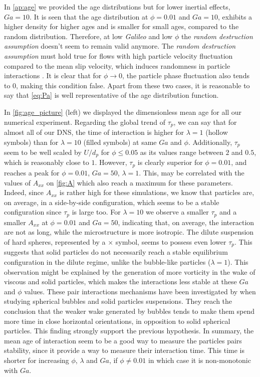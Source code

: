 In \ref{ap:age}  we provided the age distributions but for lower inertial effects, $Ga = 10$. 
It is seen that the age distribution at $\phi = 0.01$ and $Ga = 10$, exhibits a higher density for higher ages and is smaller for small ages, compared to the random distribution.
Therefore, at low \textit{Galileo} and low $\phi$ the \textit{random destruction assumption} doesn't seem to remain valid anymore. 
The \textit{random destruction assumption} must hold true for flows with high particle velocity fluctuation compared to the mean slip velocity, which induces randomness in particle interactions \citep{zhang2023evolution}. 
It is clear that for $\phi \rightarrow 0$, the particle phase fluctuation also tends to $0$, making this condition false. 
Apart from these two cases, it is reasonable to say that \ref{eq:Pa} is well representative of the age distribution function.

In \ref{fig:age_picture} (left) we displayed the dimensionless mean age for all our numerical experiment. 
Regarding the global trend of $\tau_p$, we can say that for almost all of our DNS, the time of interaction is higher for $\lambda = 1$ (hollow symbols) than for $\lambda = 10$ (filled symbols) at same $Ga$ and $\phi$.
Additionally,  $\tau_p$ seem to be well scaled by $U/d_p$ for $\phi  \leq 0.05$ as its values range between $2$ and $0.5$, which is reasonably close to $1$. 
However, $\tau_p$ is clearly superior for $\phi = 0.01$, and reaches a peak for $\phi=0.01$, $Ga=50$, $\lambda=1$.
This, may be correlated with the values of $A_{xx}$ on \ref{fig:A} which also reach a maximum for these parameters. 
Indeed, since $A_{xx}$ is rather high for these simulations, we know that particles are, on average, in a side-by-side configuration, which seems to be a stable configuration since $\tau_p$ is large too.
For $\lambda = 10$ we observe a smaller $\tau_p$ and a smaller $A_{xx}$ at $\phi = 0.01$ and $Ga = 50$, indicating that, on average, the interaction are not as long, while the microstructure is more isotropic. 
The dilute suspension of hard spheres, represented by a $\pmb\times$ symbol, seems to possess even lower $\tau_p$. 
This suggests that solid particles do not necessarily reach a stable equilibrium configuration in the dilute regime, unlike the bubble-like particles ($\lambda = 1$). 
This observation might be explained by the generation of more vorticity in the wake of viscous and solid particles, which makes the interactions less stable at these $Ga$ and $\phi$ values.
These pair interactions mechanisms have been investigated by \citet{yin2008lattice} when studying spherical bubbles and solid particles suspensions.
They reach the conclusion that the weaker wake generated by bubbles tends to make them spend more time in close horizontal orientations, in opposition to solid spherical particles. 
This finding strongly support the previous hypothesis. 
In summary, the mean age of interaction seem to be a good way to measure the particles pairs stability, since it provide a way to measure their interaction time. 
This time is shorter for increasing $\phi$, $\lambda$ and $Ga$, if $\phi \neq 0.01$ in which case it is non-monotonic with $Ga$. 

